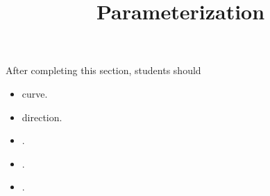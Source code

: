 \documentclass{ximera}
\title{Parameterization}
\begin{document}
\begin{abstract}
\end{abstract}
\maketitle

\begin{sectionOutcomes}
After completing this section, students should 

\begin{itemize}
\item curve.
\item direction.
\item .
\item .
\item .
\end{itemize}
\end{sectionOutcomes}
\end{document}
